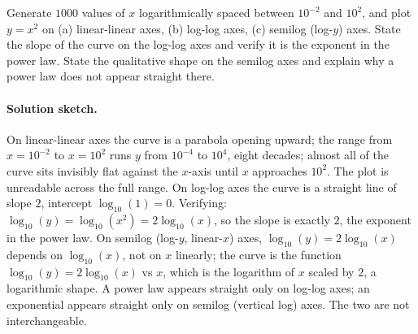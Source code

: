 \begin{exercise}
Generate $1000$ values of $x$ logarithmically spaced between $10^{-2}$
and $10^{2}$, and plot $y = x^{2}$ on (a) linear-linear axes, (b)
log-log axes, (c) semilog (log-$y$) axes. State the slope of the
curve on the log-log axes and verify it is the exponent in the
power law. State the qualitative shape on the semilog axes and
explain why a power law does not appear straight there.

\paragraph{Solution sketch.}
On linear-linear axes the curve is a parabola opening upward; the
range from $x = 10^{-2}$ to $x = 10^{2}$ runs $y$ from $10^{-4}$ to
$10^{4}$, eight decades; almost all of the curve sits invisibly
flat against the $x$-axis until $x$ approaches $10^{2}$. The plot
is unreadable across the full range.
On log-log axes the curve is a straight line of slope $2$,
intercept $\log_{10}(1) = 0$. Verifying: $\log_{10}(y) =
\log_{10}(x^{2}) = 2 \log_{10}(x)$, so the slope is exactly $2$,
the exponent in the power law.
On semilog (log-$y$, linear-$x$) axes, $\log_{10}(y) = 2 \log_{10}
(x)$ depends on $\log_{10}(x)$, not on $x$ linearly; the curve is
the function $\log_{10}(y) = 2 \log_{10}(x)$ vs $x$, which is the
logarithm of $x$ scaled by $2$, a logarithmic shape. A power law
appears straight only on log-log axes; an exponential appears
straight only on semilog (vertical log) axes. The two are not
interchangeable.
\end{exercise}

